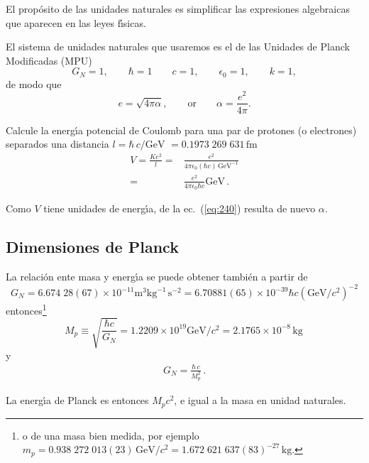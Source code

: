 \begin{frame}
El prop\'osito de las unidades naturales es simplificar las expresiones algebraicas que aparecen en las leyes f\'\i sicas. 

El sistema de unidades naturales que usaremos es el de las Unidades de Planck Modificadas (MPU)
\begin{equation}
  G_N=1,\qquad \hbar=1 \qquad c=1,\qquad \epsilon_0=1,\qquad k=1,
\end{equation}
de modo que
\begin{equation}
  e=\sqrt{4\pi\alpha},\qquad\text{or}\qquad \alpha=\frac{e^2}{4\pi}.
\end{equation}
  

\begin{example}
  Calcule la energ\'\i a potencial de Coulomb para una par de protones (o electrones) separados una distancia $l=\hbar\,c/\text{GeV}$ $=0.1973\;269\;631\,\text{fm}$
  \begin{align}
    \label{eq:240}
    V=\frac{K e^2}{l}=&\frac{e^2}{4\pi\epsilon_0(\hbar c)\,\text{GeV}^{-1}}\nonumber\\
    =&\frac{e^2}{4\pi\epsilon_0\hbar c}\text{GeV}\,.
  \end{align}
\end{example}
Como $V$ tiene unidades de energ\'\i a, de la ec.~(\ref{eq:240})  resulta de nuevo $\alpha$.
\end{frame}
\subsection{Dimensiones de Planck}


La relaci\'on ente masa y energ\'\i a se puede obtener también a partir de 
\begin{equation}
  G_N=6.674\;28(67)\times10^{-11}\text{m}^3\text{kg}^{-1}\,\text{s}^{-2}=6.70881(65)\times10^{-39}\hbar c(\text{GeV}/c^2)^{-2}
\end{equation}
entonces\footnote{o de una masa bien medida, por ejemplo
  $m_p=0.938\;272\;013(23)\,\text{GeV}/c^2=1.672\;621\;637(83)^{-27}\,\text{kg}.$
}
\begin{equation}
  M_p\equiv\sqrt{\frac{\hbar c}{G_N}}=1.2209\times10^{19}\text{GeV}/c^2=2.1765\times10^{-8}\,\text{kg}\,
\end{equation}
y
\begin{align}
  \label{eq:242}
  G_N=\frac{\hbar\,c}{M_p^2}\,.
\end{align}

La energ\'\i a de Planck es entonces $M_p c^2$, e igual a la masa en unidad naturales.


